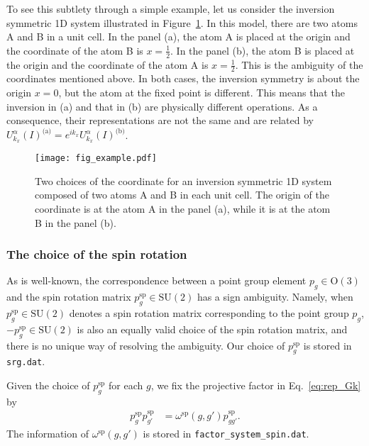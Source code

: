 \documentclass[3p,preprint]{elsarticle}
\begin{document}
To see this subtlety through a simple example, let us consider the inversion symmetric 1D system illustrated in Figure~\ref{fig:example}.  In this model, there are two atoms A and B in a unit cell.
In the panel (a), the atom A is placed at the origin and the coordinate of the atom B is $x=\frac{1}{2}$. 
In the panel (b), the atom B is placed at the origin and the coordinate of the atom A is $x=\frac{1}{2}$. This is the ambiguity of the coordinates mentioned above.
In both cases, the inversion symmetry is about the origin $x=0$, but the atom at the fixed point is different. This means that the inversion in (a) and that in (b) are physically different operations. As a consequence, their representations are not the same and  are related by ${U}_{k_x}^{\alpha}(I)^{\text{(a)}} = e^{i k_x}U_{k_x}^{\alpha}(I)^{\text{(b)}}$.

\begin{figure}[t]
	\begin{center}
		\texttt{[image: fig\_example.pdf]}
		\caption{\label{fig:example}Two choices of the coordinate for an inversion symmetric 1D system composed of two atoms A and B in each unit cell. The origin of the coordinate is at the atom A in the panel (a), while it is at the atom B in the panel (b).}
	\end{center}
\end{figure}

\subsubsection{The choice of the spin rotation}
As is well-known, the correspondence between a point group element $p_g\in\text{O}(3)$ and the spin rotation matrix $p_{g}^{\text{sp}}\in\text{SU}(2)$ has a sign ambiguity. 
Namely, when $p_{g}^{\text{sp}}\in\text{SU}(2)$ denotes a spin rotation matrix corresponding to the point group $p_g$,  $-p_{g}^{\text{sp}}\in\text{SU}(2)$ is also an equally valid choice of the spin rotation matrix, and there is no unique way of resolving the ambiguity. Our choice of $p_{g}^{\text{sp}}$ is stored in \texttt{srg.dat}.

Given the choice of $p_{g}^{\text{sp}}$ for each $g$, we fix the projective factor in Eq.~\eqref{eq:rep_Gk} by
\begin{align}
	p_{g}^{\text{sp}}p_{g'}^{\text{sp}} &=\omega^{\text{sp}}(g,g')p_{gg'}^{\text{sp}}.
	\label{spinprojective}
\end{align}
The information of $\omega^{\text{sp}}(g,g')$ is stored in \texttt{factor\_system\_spin.dat}.
\end{document}
